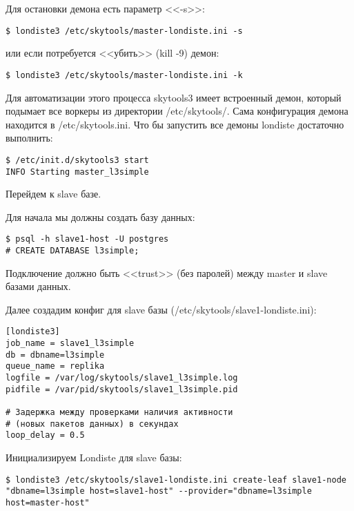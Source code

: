 Для остановки демона есть параметр <<-s>>:
\begin{lstlisting}[label=lst:londiste-replica5,caption=Остановка демона]
$ londiste3 /etc/skytools/master-londiste.ini -s
\end{lstlisting}

или если потребуется <<убить>> (kill -9) демон:
\begin{lstlisting}[label=lst:londiste-replica6,caption=Остановка демона]
$ londiste3 /etc/skytools/master-londiste.ini -k
\end{lstlisting}

Для автоматизации этого процесса skytools3 имеет встроенный демон, который подымает все воркеры из директории /etc/skytools/. Сама конфигурация демона находится в /etc/skytools.ini. Что бы запустить все демоны londiste достаточно выполнить:

\begin{lstlisting}[label=lst:londiste-replica7,caption=Демон для ticker]
$ /etc/init.d/skytools3 start
INFO Starting master_l3simple
\end{lstlisting}

Перейдем к slave базе.

Для начала мы должны создать базу данных:

\begin{lstlisting}[label=lst:londiste-replica8,caption=Копирования структуры базы]
$ psql -h slave1-host -U postgres
# CREATE DATABASE l3simple;
\end{lstlisting}

Подключение должно быть <<trust>> (без паролей) между master и slave базами данных.

Далее создадим конфиг для slave базы (/etc/skytools/slave1-londiste.ini):
\begin{lstlisting}[label=lst:londiste-replica9,caption=Создаём конфигурацию для slave]
[londiste3]
job_name = slave1_l3simple
db = dbname=l3simple
queue_name = replika
logfile = /var/log/skytools/slave1_l3simple.log
pidfile = /var/pid/skytools/slave1_l3simple.pid

# Задержка между проверками наличия активности
# (новых пакетов данных) в секундах
loop_delay = 0.5
\end{lstlisting}

Инициализируем Londiste для slave базы:

\begin{lstlisting}[label=lst:londiste-replica10,caption=Инициализируем Londiste для slave]
$ londiste3 /etc/skytools/slave1-londiste.ini create-leaf slave1-node "dbname=l3simple host=slave1-host" --provider="dbname=l3simple host=master-host"
\end{lstlisting}

